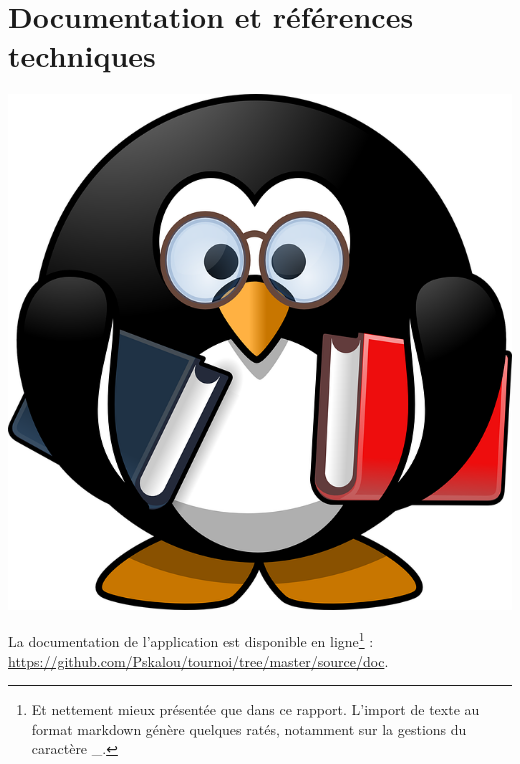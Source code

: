 \documentclass[10pt]{article}
\begin{document}
\newpage
{}
\newpage
{}
\newpage
{}
\newpage
{}



\newpage
\part{Documentation et références techniques}
\vspace*{\fill}
    \begin{center}
        \includegraphics[width=0.5\linewidth]{Doc_tux-161406_960_720.png}
    \end{center}
\vspace*{\fill}
\newpage

La documentation de l'application est disponible en ligne\footnote{Et nettement mieux présentée que dans ce rapport. L'import de texte au format markdown génère quelques ratés, notamment sur la gestions du caractère \_.} : \url{https://github.com/Pskalou/tournoi/tree/master/source/doc}.

\newpage
{}
\newpage
{}
\newpage
{}




\newpage
\end{document}
